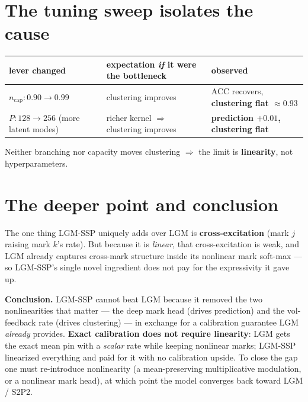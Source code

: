 \documentclass[11pt]{article}
\begin{document}
\section{The tuning sweep isolates the cause}
\begin{center}\small\renewcommand{\arraystretch}{1.2}
\begin{tabular}{>{\raggedright\arraybackslash}p{5.2cm} >{\raggedright\arraybackslash}p{5.2cm} >{\raggedright\arraybackslash}p{4.3cm}}
\toprule
lever changed & expectation \emph{if} it were the bottleneck & observed\\
\midrule
$n_{\mathrm{cap}}:0.90\to0.99$ & clustering improves & ACC recovers, \textbf{clustering flat $\approx0.93$}\\
$P:128\to256$ (more latent modes) & richer kernel $\Rightarrow$ clustering improves & \textbf{prediction $+0.01$, clustering flat}\\
\bottomrule
\end{tabular}
\end{center}
Neither branching nor capacity moves clustering $\Rightarrow$ the limit is \textbf{linearity}, not
hyperparameters.

\section{The deeper point and conclusion}
The one thing LGM-SSP uniquely adds over LGM is \textbf{cross-excitation} (mark $j$ raising mark $k$'s
rate). But because it is \emph{linear}, that cross-excitation is weak, and LGM already captures
cross-mark structure inside its nonlinear mark soft-max --- so LGM-SSP's single novel ingredient does
not pay for the expressivity it gave up.

\medskip
\noindent\textbf{Conclusion.} LGM-SSP cannot beat LGM because it removed the two nonlinearities that
matter --- the deep mark head (drives prediction) and the vol-feedback rate (drives clustering) --- in
exchange for a calibration guarantee LGM \emph{already} provides. \textbf{Exact calibration does not
require linearity}: LGM gets the exact mean pin with a \emph{scalar} rate while keeping nonlinear marks;
LGM-SSP linearized everything and paid for it with no calibration upside. To close the gap one must
re-introduce nonlinearity (a mean-preserving multiplicative modulation, or a nonlinear mark head), at
which point the model converges back toward LGM / S2P2.
\end{document}
